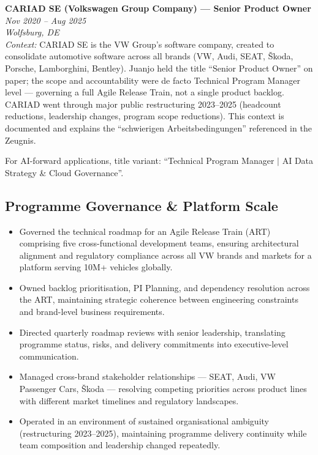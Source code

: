 \documentclass[10pt,a4paper]{article}
\newcommand{\roleentry}[3]{%
  \vspace{4pt}%
  \textbf{#1} \hfill \textit{#2}\\%
  \textit{\small #3}\\[-2pt]%
}
\begin{document}
\vspace{8pt}

\roleentry{CARIAD SE (Volkswagen Group Company) — Senior Product Owner}
  {Nov 2020 – Aug 2025}
  {Wolfsburg, DE}

\textit{Context:} CARIAD SE is the VW Group's software company, created to consolidate automotive
software across all brands (VW, Audi, SEAT, Škoda, Porsche, Lamborghini, Bentley). Juanjo held
the title ``Senior Product Owner'' on paper; the scope and accountability were de facto
Technical Program Manager level — governing a full Agile Release Train, not a single product backlog.
CARIAD went through major public restructuring 2023–2025 (headcount reductions, leadership changes,
program scope reductions). This context is documented and explains the ``schwierigen Arbeitsbedingungen''
referenced in the Zeugnis.

For AI-forward applications, title variant: ``Technical Program Manager $|$ AI Data Strategy \& Cloud Governance''.

\subsection*{Programme Governance \& Platform Scale}

\begin{itemize}
  \item Governed the technical roadmap for an Agile Release Train (ART) comprising five cross-functional
        development teams, ensuring architectural alignment and regulatory compliance across all VW brands
        and markets for a platform serving 10M+ vehicles globally.
  \item Owned backlog prioritisation, PI Planning, and dependency resolution across the ART,
        maintaining strategic coherence between engineering constraints and brand-level business requirements.
  \item Directed quarterly roadmap reviews with senior leadership, translating programme status,
        risks, and delivery commitments into executive-level communication.
  \item Managed cross-brand stakeholder relationships — SEAT, Audi, VW Passenger Cars, Škoda —
        resolving competing priorities across product lines with different market timelines and regulatory landscapes.
  \item Operated in an environment of sustained organisational ambiguity (restructuring 2023–2025),
        maintaining programme delivery continuity while team composition and leadership changed repeatedly.
\end{itemize}
\end{document}

